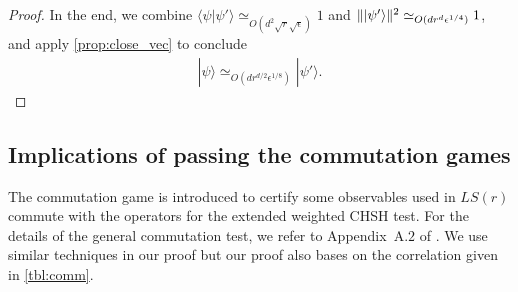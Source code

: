 \documentclass[11pt,letterpaper]{article}
\newcommand{\ket}[1]{|#1\rangle}
\newcommand{\braket}[2]{\langle#1|#2\rangle}
\DeclarePairedDelimiter{\norm}{\lVert}{\rVert}
\newcommand{\1}{\mathbb{1}}
\newcommand{\LS}{LS}
\newcommand{\ep}{\epsilon}
\newcommand{\se}{\sqrt{\epsilon}}
\newcommand{\qe}{\epsilon^{1/4}}
\newcommand{\sr}{\sqrt{r}}
\newcommand{\appd}[1]{\simeq_{#1}}
\theoremstyle{definition}
\begin{document}
\begin{proof}
	In the end, we combine $\braket{\psi}{\psi'} \appd{O(d^2 \sr \se)} 1$ and $\norm{\ket{\psi'}}^2 \appd{O(d r^d \qe)} 1$,
	and apply \cref{prop:close_vec} to conclude
	\begin{align*}
		\ket{\psi} \appd{O(d r^{d/2} \ep^{1/8})} \ket{\psi'}.
	\end{align*}
\end{proof}


\subsection{Implications of passing the commutation games}
\label{sec:imp_comm}
The commutation game is introduced to certify some observables used in $\LS(r)$ commute with 
the operators for the extended weighted CHSH test. For the details of the general commutation test, 
we refer to Appendix~A.$2$ of \cite{coladan2017verifier}. 
We use similar techniques in our proof but our proof also bases on the correlation given in \cref{tbl:comm}.
\end{document}
